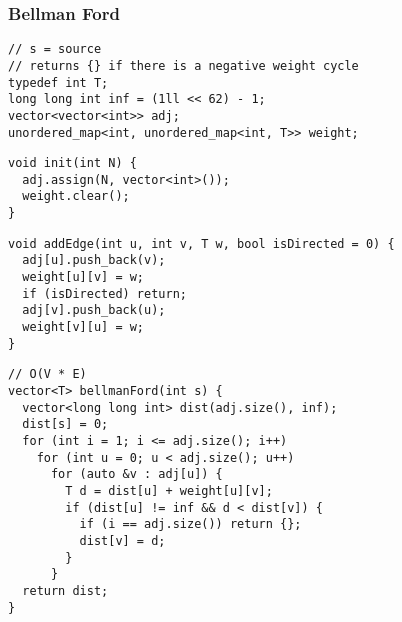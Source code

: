 \documentclass[twoside]{article}
\begin{document}
\begin{multicols*}{2}
\subsubsectionfont{\large\bfseries\sffamily\underline}
\subsubsection*{Bellman Ford}
\begin{verbatim}
// s = source
// returns {} if there is a negative weight cycle
typedef int T;
long long int inf = (1ll << 62) - 1;
vector<vector<int>> adj;
unordered_map<int, unordered_map<int, T>> weight;
\end{verbatim}
\vspace{-12pt}
\begin{verbatim}
void init(int N) {
  adj.assign(N, vector<int>());
  weight.clear();
}
\end{verbatim}
\vspace{-12pt}
\begin{verbatim}
void addEdge(int u, int v, T w, bool isDirected = 0) {
  adj[u].push_back(v);
  weight[u][v] = w;
  if (isDirected) return;
  adj[v].push_back(u);
  weight[v][u] = w;
}
\end{verbatim}
\vspace{-12pt}
\begin{verbatim}
// O(V * E)
vector<T> bellmanFord(int s) {
  vector<long long int> dist(adj.size(), inf);
  dist[s] = 0;
  for (int i = 1; i <= adj.size(); i++)
    for (int u = 0; u < adj.size(); u++)
      for (auto &v : adj[u]) {
        T d = dist[u] + weight[u][v];
        if (dist[u] != inf && d < dist[v]) {
          if (i == adj.size()) return {};
          dist[v] = d;
        }
      }
  return dist;
}
\end{verbatim}

\subsubsectionfont{\large\bfseries\sffamily\underline}

\end{multicols*}
\end{document}
